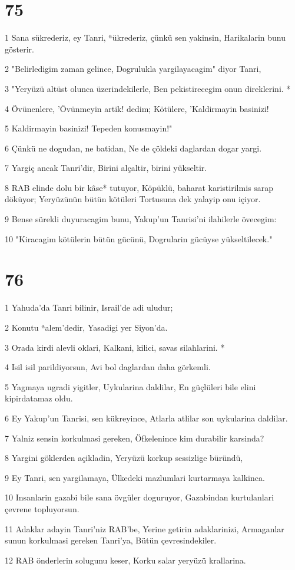 \chapter{75}

\par 1 Sana sükrederiz, ey Tanri, ªükrederiz, çünkü sen yakinsin, Harikalarin bunu gösterir.
\par 2 "Belirledigim zaman gelince, Dogrulukla yargilayacagim" diyor Tanri,
\par 3 "Yeryüzü altüst olunca üzerindekilerle, Ben pekistirecegim onun direklerini. *
\par 4 Övünenlere, 'Övünmeyin artik! dedim; Kötülere, 'Kaldirmayin basinizi!
\par 5 Kaldirmayin basinizi! Tepeden konusmayin!"
\par 6 Çünkü ne dogudan, ne batidan, Ne de çöldeki daglardan dogar yargi.
\par 7 Yargiç ancak Tanri'dir, Birini alçaltir, birini yükseltir.
\par 8 RAB elinde dolu bir kâse* tutuyor, Köpüklü, baharat karistirilmis sarap döküyor; Yeryüzünün bütün kötüleri Tortusuna dek yalayip onu içiyor.
\par 9 Bense sürekli duyuracagim bunu, Yakup'un Tanrisi'ni ilahilerle övecegim:
\par 10 "Kiracagim kötülerin bütün gücünü, Dogrularin gücüyse yükseltilecek."

\chapter{76}

\par 1 Yahuda'da Tanri bilinir, Israil'de adi uludur;
\par 2 Konutu ªalem'dedir, Yasadigi yer Siyon'da.
\par 3 Orada kirdi alevli oklari, Kalkani, kilici, savas silahlarini. *
\par 4 Isil isil parildiyorsun, Avi bol daglardan daha görkemli.
\par 5 Yagmaya ugradi yigitler, Uykularina daldilar, En güçlüleri bile elini kipirdatamaz oldu.
\par 6 Ey Yakup'un Tanrisi, sen kükreyince, Atlarla atlilar son uykularina daldilar.
\par 7 Yalniz sensin korkulmasi gereken, Öfkelenince kim durabilir karsinda?
\par 8 Yargini göklerden açikladin, Yeryüzü korkup sessizlige büründü,
\par 9 Ey Tanri, sen yargilamaya, Ülkedeki mazlumlari kurtarmaya kalkinca.
\par 10 Insanlarin gazabi bile sana övgüler doguruyor, Gazabindan kurtulanlari çevrene topluyorsun.
\par 11 Adaklar adayin Tanri'niz RAB'be, Yerine getirin adaklarinizi, Armaganlar sunun korkulmasi gereken Tanri'ya, Bütün çevresindekiler.
\par 12 RAB önderlerin solugunu keser, Korku salar yeryüzü krallarina.

